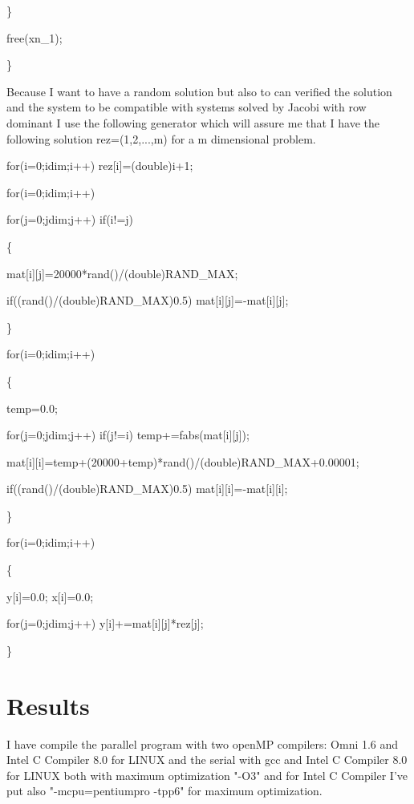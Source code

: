 \documentclass[a4paper]{article}
\begin{document}
{\small \qquad \}}

{\small \qquad free(xn\_1);}

{\small \}}

Because I want to have a random solution but also to can verified the
solution and the system to be compatible with systems solved by Jacobi with
row dominant I use the following generator which will assure me that I have
the following solution rez=(1,2,...,m) for a m dimensional problem.

{\small \qquad for(i=0;i\TEXTsymbol{<}dim;i++) rez[i]=(double)i+1;}

{\small \qquad for(i=0;i\TEXTsymbol{<}dim;i++)}

{\small \qquad \qquad for(j=0;j\TEXTsymbol{<}dim;j++) if(i!=j)}

{\small \qquad \qquad \qquad \{}

{\small \qquad \qquad \qquad \qquad mat[i][j]=20000*rand()/(double)RAND\_MAX;%
}

{\small \qquad \qquad \qquad \qquad if((rand()/(double)RAND\_MAX)\TEXTsymbol{%
<}0.5) mat[i][j]=-mat[i][j];}

{\small \qquad \qquad \qquad \}}

{\small \qquad for(i=0;i\TEXTsymbol{<}dim;i++)}

{\small \qquad \{}

{\small \qquad \qquad temp=0.0;}

{\small \qquad \qquad for(j=0;j\TEXTsymbol{<}dim;j++) if(j!=i)
temp+=fabs(mat[i][j]);}

{\small \qquad \qquad
mat[i][i]=temp+(20000+temp)*rand()/(double)RAND\_MAX+0.00001;}

{\small \qquad \qquad if((rand()/(double)RAND\_MAX)\TEXTsymbol{<}0.5)
mat[i][i]=-mat[i][i];}

{\small \qquad \}}

{\small \qquad for(i=0;i\TEXTsymbol{<}dim;i++)}

{\small \qquad \{}

{\small \qquad \qquad y[i]=0.0; x[i]=0.0;}

{\small \qquad \qquad for(j=0;j\TEXTsymbol{<}dim;j++) y[i]+=mat[i][j]*rez[j];%
}

{\small \qquad \}}

\section{Results}

I have compile the parallel program with two openMP compilers: Omni 1.6 and
Intel C Compiler 8.0 for LINUX and the serial with gcc and Intel C Compiler
8.0 for LINUX both with maximum optimization "-O3" and for Intel C Compiler
I've put also "-mcpu=pentiumpro -tpp6" for maximum optimization.
\end{document}

